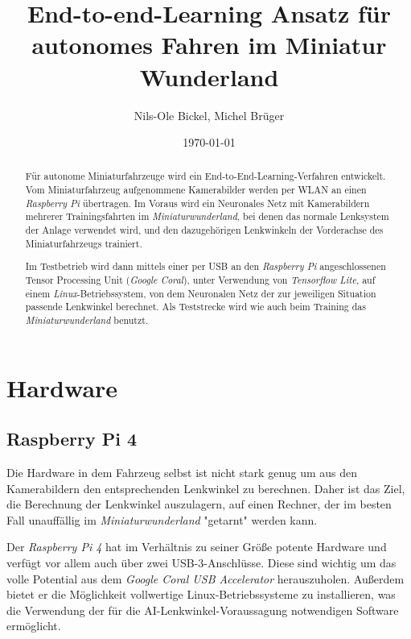 \documentclass[a4paper, 12pt]{scrartcl}
\title{End-to-end-Learning Ansatz für autonomes Fahren im Miniatur Wunderland}
\author{Nils-Ole Bickel, Michel Brüger}
\date{\today}
\begin{document}
	
\maketitle



\begin{abstract}	
Für autonome Miniaturfahrzeuge wird ein End-to-End-Learning-Verfahren entwickelt. Vom Miniaturfahrzeug aufgenommene Kamerabilder werden per WLAN an einen \emph{Raspberry Pi} übertragen. Im Voraus wird ein Neuronales Netz mit Kamerabildern mehrerer Trainingsfahrten im \emph{Miniaturwunderland}, bei denen das normale Lenksystem der Anlage verwendet wird, und den dazugehörigen Lenkwinkeln der Vorderachse des Miniaturfahrzeugs trainiert. 

Im Testbetrieb wird dann mittels einer per USB an den \emph{Raspberry Pi} angeschlossenen Tensor Processing Unit (\emph{Google Coral}), unter Verwendung von \emph{Tensorflow Lite}, auf einem \emph{Linux}-Betriebssystem, von dem Neuronalen Netz der zur jeweiligen Situation passende Lenkwinkel berechnet.
Als Teststrecke wird wie auch beim Training das \emph{Miniaturwunderland} benutzt.
\end{abstract}

\newpage	


\newpage
	


	\section{Hardware}
		\subsection{Raspberry Pi 4}
		Die Hardware in dem Fahrzeug selbst ist nicht stark genug um aus den Kamerabildern den entsprechenden Lenkwinkel zu berechnen. Daher ist das Ziel, die Berechnung der Lenkwinkel auszulagern, auf einen Rechner, der im besten Fall unauffällig im \emph{Miniaturwunderland} "getarnt" werden kann. 
		
		Der \emph{Raspberry Pi 4} hat im Verhältnis zu seiner Größe potente Hardware und verfügt vor allem auch über zwei USB-3-Anschlüsse. Diese sind wichtig um das volle Potential aus dem \emph{Google Coral USB Accelerator} herauszuholen. Außerdem bietet er die Möglichkeit vollwertige Linux-Betriebssysteme zu installieren, was die Verwendung der für die AI-Lenkwinkel-Voraussagung notwendigen Software ermöglicht.
		
\end{document}
